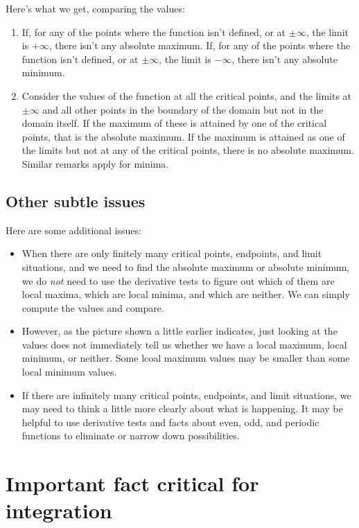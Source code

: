 \documentclass{amsart}
\begin{document}
Here's what we get, comparing the values:

\begin{enumerate}
\item If, for any of the points where the function isn't defined, or
  at $\pm \infty$, the limit is $+\infty$, there isn't any absolute
  maximum. If, for any of the points where the function isn't defined,
  or at $\pm \infty$, the limit is $-\infty$, there isn't any absolute
  minimum.
\item Consider the values of the function at all the critical points,
  and the limits at $\pm \infty$ and all other points in the boundary
  of the domain but not in the domain itself. If the maximum of these
  is attained by one of the critical points, that is the absolute
  maximum. If the maximum is attained as one of the limits but not at
  any of the critical points, there is no absolute maximum. Similar
  remarks apply for minima.
\end{enumerate}

\subsection{Other subtle issues}

Here are some additional issues:

\begin{itemize}
\item When there are only finitely many critical points, endpoints,
  and limit situations, and we need to find the absolute maximum or
  absolute minimum, we do {\em not} need to use the derivative tests
  to figure out which of them are local maxima, which are local
  minima, and which are neither. We can simply compute the values and
  compare.
\item However, as the picture shown a little earlier indicates, just
  looking at the values does not immediately tell us whether we have a
  local maximum, local minimum, or neither. Some lcoal maximum values
  may be smaller than some local minimum values.
\item If there are infinitely many critical points, endpoints, and
  limit situations, we may need to think a little more clearly about
  what is happening. It may be helpful to use derivative tests and
  facts about even, odd, and periodic functions to eliminate or narrow
  down possibilities.
\end{itemize}
\section{Important fact critical for integration}
\end{document}
